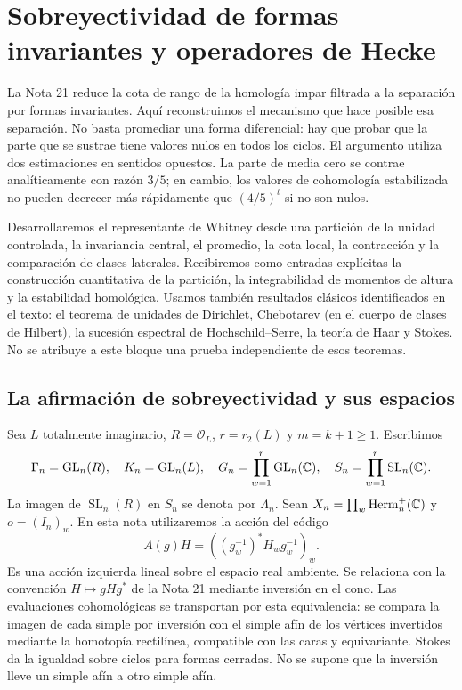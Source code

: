 \section{Sobreyectividad de formas invariantes y operadores de Hecke}
\label{sec:sobreyectividad-hecke}

La Nota 21 reduce la cota de rango de la homología impar filtrada a la separación por formas invariantes. Aquí reconstruimos el mecanismo que hace posible esa separación. No basta promediar una forma diferencial: hay que probar que la parte que se sustrae tiene valores nulos en todos los ciclos. El argumento utiliza dos estimaciones en sentidos opuestos. La parte de media cero se contrae analíticamente con razón $3/5$; en cambio, los valores de cohomología estabilizada no pueden decrecer más rápidamente que $(4/5)^t$ si no son nulos.

Desarrollaremos el representante de Whitney desde una partición de la unidad controlada, la invariancia central, el promedio, la cota local, la contracción y la comparación de clases laterales. Recibiremos como entradas explícitas la construcción cuantitativa de la partición, la integrabilidad de momentos de altura y la estabilidad homológica. Usamos también resultados clásicos identificados en el texto: el teorema de unidades de Dirichlet, Chebotarev (en el cuerpo de clases de Hilbert), la sucesión espectral de Hochschild--Serre, la teoría de Haar y Stokes. No se atribuye a este bloque una prueba independiente de esos teoremas.

\subsection{La afirmación de sobreyectividad y sus espacios}

Sea $L$ totalmente imaginario, $R=\mathcal O_L$, $r=r_2(L)$ y $m=k+1\ge1$. Escribimos
\[
 \Gamma_n=\operatorname{GL}_n(R),\quad K_n=\operatorname{GL}_n(L),\quad
 G_n=\prod_{w=1}^{r}\operatorname{GL}_n(\mathbb{C}),\quad
 S_n=\prod_{w=1}^{r}\operatorname{SL}_n(\mathbb{C}).
\]
La imagen de $\operatorname{SL}_n(R)$ en $S_n$ se denota por $\Lambda_n$. Sean $X_n=\prod_w\operatorname{Herm}_n^+(\mathbb{C})$ y $o=(I_n)_w$. En esta nota utilizaremos la acción del código
\begin{equation}
 A(g)H=((g_w^{-1})^*H_wg_w^{-1})_w.
 \label{eq:sh-accion}
\end{equation}
Es una acción izquierda lineal sobre el espacio real ambiente. Se relaciona con la convención $H\mapsto gHg^*$ de la Nota 21 mediante inversión en el cono. Las evaluaciones cohomológicas se transportan por esta equivalencia: se compara la imagen de cada simple por inversión con el simple afín de los vértices invertidos mediante la homotopía rectilínea, compatible con las caras y equivariante. Stokes da la igualdad sobre ciclos para formas cerradas. No se supone que la inversión lleve un simple afín a otro simple afín.

